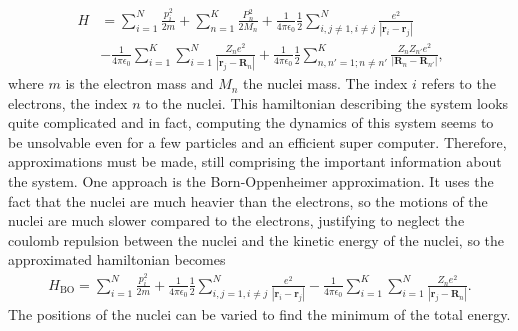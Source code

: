 \documentclass[10pt,a4paper]{article} %
\begin{document}
    \begin{align*}
    H &= \sum_{i=1}^N \frac{p_i^2}{2m} + \sum_{n=1}^K \frac{P_n^2}{2M_n} + \frac{1}{4\pi \epsilon_0}\frac{1}{2}\sum_{i,j\neq 1, i \neq j}^N \frac{e^2}{|\mathbf{r}_i - \mathbf{r}_j|} \\ &-  \frac{1}{4\pi \epsilon_0}\sum_{i=1}^K \sum_{i=1}^N \frac{Z_n e^2}{|\mathbf{r}_j-\mathbf{R}_n|} +  \frac{1}{4\pi \epsilon_0}\frac{1}{2} \sum_{n,n'=1;n\neq n'}^K \frac{Z_n Z_{n'} e^2}{|\mathbf{R}_n - \mathbf{R}_{n'}|} \text{,}
    \end{align*} where $m$ is the electron mass and $M_n$ the nuclei mass. The index $i$ refers to the electrons, the index $n$ to the nuclei.
This hamiltonian describing the system looks quite complicated and in fact, computing the dynamics of this system seems to be unsolvable even for a few particles and an efficient super computer. Therefore, approximations must be made, still comprising the important information about the system. One approach is the Born-Oppenheimer approximation. It uses the fact that the nuclei are much heavier than the electrons, so the motions of the nuclei are much slower compared to the electrons, justifying to neglect the coulomb repulsion between the nuclei and the kinetic energy of the nuclei, so the approximated hamiltonian becomes
\begin{align}\label{eq:H_BO}
H_\text{BO} = \sum_{i=1}^N \frac{p_i^2}{2m}  + \frac{1}{4\pi \epsilon_0}\frac{1}{2}\sum_{i,j = 1, i \neq j}^N \frac{e^2}{|\mathbf{r}_i - \mathbf{r}_j|} -  \frac{1}{4\pi \epsilon_0}\sum_{i=1}^K \sum_{i=1}^N \frac{Z_n e^2}{|\mathbf{r}_j-\mathbf{R}_n|}  \text{.}
\end{align}  
The positions of the nuclei can be varied to find the minimum of the total energy.
\end{document}
